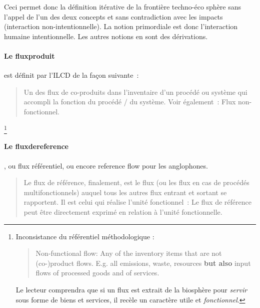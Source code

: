 Ceci permet donc la définition itérative de la frontière techno-éco sphère sans l'appel de l'un des deux concepts et sans contradiction avec les impacts (interaction non-intentionnelle).
La notion primordiale est donc l'interaction humaine intentionnelle.
Les autres notions en sont des dérivations.
\paragraph{Le \gls{fluxproduit}} est définit par l'ILCD de la façon suivante~:
\blockcquote[traduction p.22]{european_commission_ilcd_2010}{
Un des flux de co-produits dans l'inventaire d'un procédé ou système qui accompli la fonction du procédé / du système.
Voir également~: Flux non-fonctionnel.
}
\footnote{Inconsistance du référentiel méthodologique : \blockcquote[p.22]{european_commission_ilcd_2010}{Non-functional flow: Any of the inventory items that are not (co-)product flows. E.g. all emissions, waste, resources \textbf{but also} input flows of processed goods and of services.}
Le lecteur comprendra que si un flux est extrait de la biosphère pour \emph{servir} sous forme de biens et services, il recèle un caractère utile et \emph{fonctionnel}.}

\paragraph{Le \gls{fluxdereference}}, ou flux référentiel, ou encore reference flow pour les anglophones.
\blockcquote[Traduit de Terms and concepts: Function, functional unit, and reference flow p.60]{european_commission_ilcd_2010}{Le flux de référence, finalement, est le flux (ou les flux en cas de procédés multifonctionnels) auquel tous les autres flux entrant et sortant se rapportent. Il est celui qui réalise l'unité fonctionnel~: Le flux de référence peut être directement exprimé en relation à l'unité fonctionnelle.}
%

